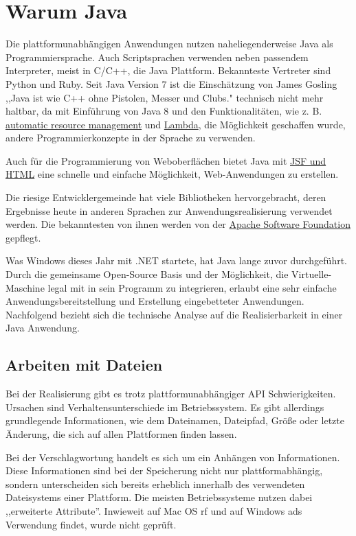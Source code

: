 \documentclass[oneside, ngerman, toc=bibliography,bibliography=totoc,listof=entryprefix, open=right,numbers=noenddot,fontsize=12pt]{scrbook}
\begin{document}
\section{Warum Java}
Die plattformunabhängigen Anwendungen nutzen naheliegenderweise Java als Programmiersprache. Auch Scriptsprachen verwenden neben passendem Interpreter, meist in C/C++, die Java Plattform. Bekannteste Vertreter sind Python und Ruby.
Seit Java Version 7 ist die Einschätzung von James Gosling ,,Java ist wie C++ ohne Pistolen, Messer und Clubs." technisch nicht mehr haltbar, da mit Einführung von Java 8 und den Funktionalitäten, wie z. B.  \href{http://www.oracle.com/technetwork/articles/java/trywithresources-401775.html}{automatic resource management} und \href{http://www.oracle.com/technetwork/articles/java/rich-client-lambdas-2227138.html}{Lambda}, die Möglichkeit geschaffen wurde, andere Programmierkonzepte in der Sprache zu verwenden.

Auch für die Programmierung von Weboberflächen bietet Java mit \href{http://www.oracle.com/technetwork/articles/java/enterprise-html5-2227136.html}{JSF und HTML} eine schnelle und einfache Möglichkeit, Web-Anwendungen zu erstellen.

Die riesige Entwicklergemeinde hat viele Bibliotheken hervorgebracht, deren Ergebnisse heute in anderen Sprachen zur Anwendungsrealisierung verwendet werden. Die bekanntesten von ihnen werden von der
\href{http://www.apache.org/}{ Apache Software Foundation } gepflegt.


Was Windows dieses Jahr mit {.NET} startete, hat Java lange zuvor durchgeführt. Durch die gemeinsame Open-Source Basis und der Möglichkeit, die Virtuelle-Maschine legal mit in sein Programm zu integrieren, erlaubt eine sehr einfache Anwendungsbereitstellung und Erstellung eingebetteter Anwendungen. Nachfolgend bezieht sich die technische Analyse auf die Realisierbarkeit in einer Java Anwendung.


\subsection{Arbeiten mit Dateien}
Bei der Realisierung gibt es trotz plattformunabhängiger API Schwierigkeiten. Ursachen sind Verhaltensunterschiede im Betriebssystem.
Es gibt allerdings grundlegende Informationen, wie dem Dateinamen, Dateipfad, Größe oder letzte Änderung, die sich auf allen Plattformen finden lassen.

Bei der Verschlagwortung handelt es sich um ein Anhängen von Informationen. Diese Informationen sind bei der Speicherung nicht nur plattformabhängig, sondern unterscheiden sich bereits erheblich innerhalb des verwendeten Dateisystems einer Plattform.
Die meisten Betriebssysteme nutzen dabei ,,erweiterte Attribute''. Inwieweit auf Mac OS \acrshort{rf} und auf Windows \acrshort{ads} Verwendung findet, wurde nicht geprüft.  
 
\end{document}
